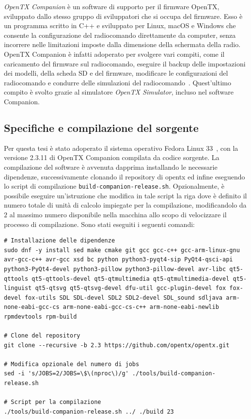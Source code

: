 \documentclass[a4paper, 12pt]{report}
\begin{document}
\emph{OpenTX Companion} è un software di supporto per il firmware OpenTX, sviluppato dallo stesso gruppo di sviluppatori che si occupa del firmware. Esso è un programma scritto in C++ e sviluppato per Linux, macOS e Windows che consente la configurazione del radiocomando direttamente da computer, senza incorrere nelle limitazioni imposte dalla dimensione della schermata della radio. OpenTX Companion è infatti adoperato per svolgere vari compiti, come il caricamento del firmware sul radiocomando, eseguire il backup delle impostazioni dei modelli, della scheda SD e del firmware, modificare le configurazioni del radiocomando e condurre delle simulazioni del radiocomando~\cite{opentx-companion-manual}. Quest'ultimo compito è svolto grazie al simulatore \emph{OpenTX Simulator}, incluso nel software Companion.

\subsection{Specifiche e compilazione del sorgente}
Per questa tesi è stato adoperato il sistema operativo Fedora Linux 33~\cite{fedora-website}, con la versione 2.3.11 di OpenTX Companion compilata da codice sorgente.
La compilazione del software è avvenuta dapprima installando le necessarie dipendenze, successivamente clonando il repository di opentx ed infine eseguendo lo script di compilazione \texttt{build-companion-release.sh}. Opzionalmente, è possibile eseguire un'istruzione che modifica in tale script la riga dove è definito il numero totale di unità di calcolo impiegate per la compilazione, modificandolo da $2$ al massimo numero disponibile nella macchina allo scopo di velocizzare il processo di compilazione. Sono stati eseguiti i seguenti comandi:

\begin{lstlisting}
# Installazione delle dipendenze
sudo dnf -y install sed make cmake git gcc gcc-c++ gcc-arm-linux-gnu avr-gcc-c++ avr-gcc xsd bc python python3-pyqt4-sip PyQt4-qsci-api python3-PyQt4-devel python3-pillow python3-pillow-devel avr-libc qt5-qttools qt5-qttools-devel qt5-qtmultimedia qt5-qtmultimedia-devel qt5-linguist qt5-qtsvg qt5-qtsvg-devel dfu-util gcc-plugin-devel fox fox-devel fox-utils SDL SDL-devel SDL2 SDL2-devel SDL_sound sdljava arm-none-eabi-gcc-cs arm-none-eabi-gcc-cs-c++ arm-none-eabi-newlib rpmdevtools rpm-build

# Clone del repository
git clone --recursive -b 2.3 https://github.com/opentx/opentx.git

# Modifica opzionale del numero di jobs
sed -i 's/JOBS=2/JOBS=\$\(nproc\)/g' ./tools/build-companion-release.sh

# Script per la compilazione
./tools/build-companion-release.sh ../ ./build 23
\end{lstlisting}
\end{document}
